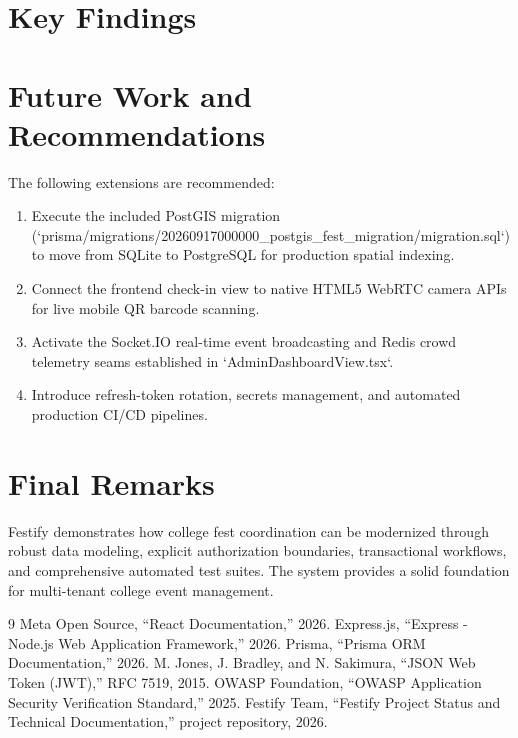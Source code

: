 \documentclass[11pt,a4paper]{report}
\begin{document}
\section{Key Findings}

\section{Future Work and Recommendations}
The following extensions are recommended:
\begin{enumerate}
  \item Execute the included PostGIS migration (`prisma/migrations/20260917000000_postgis_fest_migration/migration.sql`) to move from SQLite to PostgreSQL for production spatial indexing.
  \item Connect the frontend check-in view to native HTML5 WebRTC camera APIs for live mobile QR barcode scanning.
  \item Activate the Socket.IO real-time event broadcasting and Redis crowd telemetry seams established in `AdminDashboardView.tsx`.
  \item Introduce refresh-token rotation, secrets management, and automated production CI/CD pipelines.
\end{enumerate}

\section{Final Remarks}
Festify demonstrates how college fest coordination can be modernized through robust data modeling, explicit authorization boundaries, transactional workflows, and comprehensive automated test suites. The system provides a solid foundation for multi-tenant college event management.

\begin{thebibliography}{9}
 Meta Open Source, ``React Documentation,'' 2026.
 Express.js, ``Express - Node.js Web Application Framework,'' 2026.
 Prisma, ``Prisma ORM Documentation,'' 2026.
 M. Jones, J. Bradley, and N. Sakimura, ``JSON Web Token (JWT),'' RFC 7519, 2015.
 OWASP Foundation, ``OWASP Application Security Verification Standard,'' 2025.
 Festify Team, ``Festify Project Status and Technical Documentation,'' project repository, 2026.
\end{thebibliography}
\end{document}
